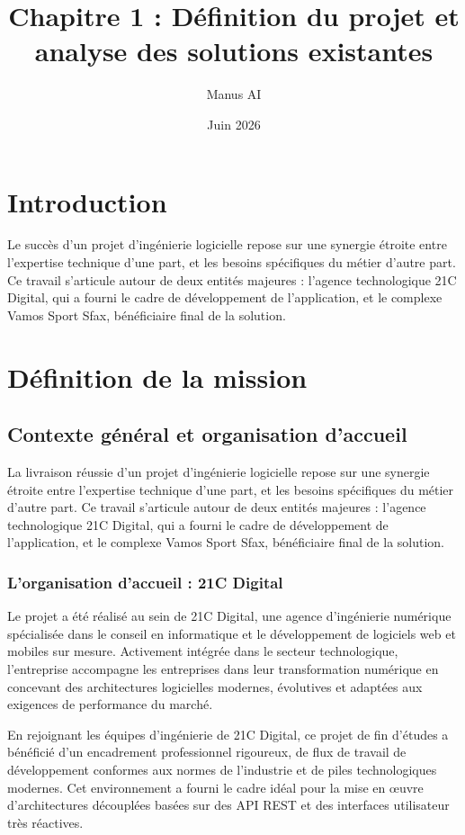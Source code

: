 \documentclass{article}
\title{Chapitre 1 : Définition du projet et analyse des solutions existantes}
\author{Manus AI}
\date{Juin 2026}
\begin{document}
\maketitle

\section{Introduction}

Le succès d'un projet d'ingénierie logicielle repose sur une synergie étroite entre l'expertise technique d'une part, et les besoins spécifiques du métier d'autre part. Ce travail s'articule autour de deux entités majeures : l'agence technologique 21C Digital, qui a fourni le cadre de développement de l'application, et le complexe Vamos Sport Sfax, bénéficiaire final de la solution.

\section{Définition de la mission}

\subsection{Contexte général et organisation d'accueil}

La livraison réussie d'un projet d'ingénierie logicielle repose sur une synergie étroite entre l'expertise technique d'une part, et les besoins spécifiques du métier d'autre part. Ce travail s'articule autour de deux entités majeures : l'agence technologique 21C Digital, qui a fourni le cadre de développement de l'application, et le complexe Vamos Sport Sfax, bénéficiaire final de la solution.

\subsubsection{L'organisation d'accueil : 21C Digital}

Le projet a été réalisé au sein de 21C Digital, une agence d'ingénierie numérique spécialisée dans le conseil en informatique et le développement de logiciels web et mobiles sur mesure. Activement intégrée dans le secteur technologique, l'entreprise accompagne les entreprises dans leur transformation numérique en concevant des architectures logicielles modernes, évolutives et adaptées aux exigences de performance du marché.

En rejoignant les équipes d'ingénierie de 21C Digital, ce projet de fin d'études a bénéficié d'un encadrement professionnel rigoureux, de flux de travail de développement conformes aux normes de l'industrie et de piles technologiques modernes. Cet environnement a fourni le cadre idéal pour la mise en œuvre d'architectures découplées basées sur des API REST et des interfaces utilisateur très réactives.
\end{document}
